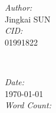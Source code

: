 \begin{titlepage}
    \begin{minipage}{0.4\textwidth}
      \begin{flushleft} \large
      \emph{Author:}\\
      Jingkai \textsc{SUN} \\[0.5cm]
      \emph{CID:}\\
      01991822
      \end{flushleft}
      \end{minipage}
      ~
      \begin{minipage}{0.5\textwidth}
      \begin{flushright} \large
      \emph{Date:} \\
      \today \\[0.5cm] %
      \emph{Word Count:} \\


      \end{flushright}
    \end{minipage}\\[1cm]



    \vfill %

\end{titlepage}
